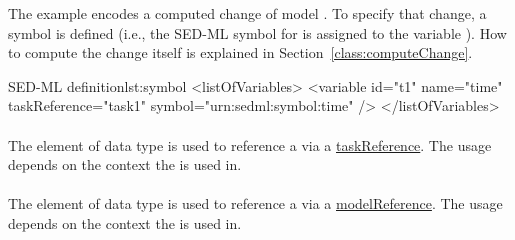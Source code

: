 The example encodes a computed change of model . To specify that change, a symbol is defined (i.e., the SED-ML symbol for  is assigned to the variable ). How to compute the change itself is explained in Section~\ref{class:computeChange}.

\begin{myXmlLst}{SED-ML  definition}{lst:symbol}
<listOfVariables>
	<variable id="t1" name="time" taskReference="task1" symbol="urn:sedml:symbol:time" />
</listOfVariables>
\end{myXmlLst}

\paragraph*{}
\label{sec:taskReferenceAttribute}
The  element of data type \SIdRef is used to reference a \Task via a \hyperref[sec:taskReference]{taskReference}. The usage depends on the context the \Variable is used in.

\paragraph*{}
\label{sec:modelReferenceAttribute}
The  element of data type \SIdRef is used to reference a \Model via a \hyperref[sec:modelReference]{modelReference}. The usage depends on the context the \Variable is used in.


